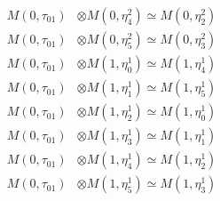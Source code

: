 \begin{align*}
M(0,\tau_{01}) &\otimes M(0,\eta^{2}_{4}) \simeq M(0,\eta^{2}_{2}) \\
M(0,\tau_{01}) &\otimes M(0,\eta^{2}_{5}) \simeq M(0,\eta^{2}_{3}) \\
M(0,\tau_{01}) &\otimes M(1,\eta^{1}_{0}) \simeq M(1,\eta^{1}_{4}) \\
M(0,\tau_{01}) &\otimes M(1,\eta^{1}_{1}) \simeq M(1,\eta^{1}_{5}) \\
M(0,\tau_{01}) &\otimes M(1,\eta^{1}_{2}) \simeq M(1,\eta^{1}_{0}) \\
M(0,\tau_{01}) &\otimes M(1,\eta^{1}_{3}) \simeq M(1,\eta^{1}_{1}) \\
M(0,\tau_{01}) &\otimes M(1,\eta^{1}_{4}) \simeq M(1,\eta^{1}_{2}) \\
M(0,\tau_{01}) &\otimes M(1,\eta^{1}_{5}) \simeq M(1,\eta^{1}_{3}) \\
\end{align*}

